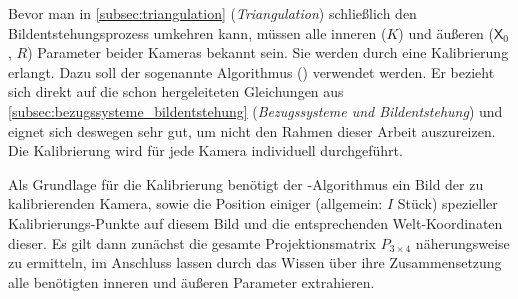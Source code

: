 Bevor man in \ref{subsec:triangulation} (\emph{Triangulation}) schließlich den Bildentstehungsprozess umkehren kann, müssen alle inneren ($K$) und äußeren ($\mathsf{X}_0$, $R$) Parameter beider Kameras bekannt sein. Sie werden durch eine Kalibrierung erlangt. Dazu soll der sogenannte Algorithmus  () verwendet werden. Er bezieht sich direkt auf die schon hergeleiteten Gleichungen aus \ref{subsec:bezugssysteme_bildentstehung} (\emph{Bezugssysteme und Bildentstehung}) und eignet sich deswegen sehr gut, um nicht den Rahmen dieser Arbeit auszureizen. Die Kalibrierung wird für jede Kamera individuell durchgeführt.

Als Grundlage für die Kalibrierung benötigt der -Algorithmus ein Bild der zu kalibrierenden Kamera, sowie die Position einiger (allgemein: $I$ Stück) spezieller Ka\-li\-brie\-rungs-Punkte auf diesem Bild und die entsprechenden Welt-Koordinaten dieser.
{\noindent}Es gilt dann zunächst die gesamte Projektionsmatrix $P_{3{\times}4}$ näherungsweise zu ermitteln, im Anschluss lassen durch das Wissen über ihre Zusammensetzung alle benötigten inneren und äußeren Parameter extrahieren.\kleinerabstand

